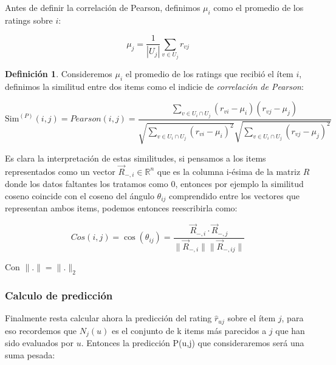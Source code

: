 \documentclass[hidelinks,12pt,a4paper]{book}
\providecommand{\norm}[1]{\lVert#1\rVert}
\theoremstyle{plain}
\theoremstyle{definition}
\newtheorem{definicion}[theorem]{Definición} %
\begin{document}
Antes de definir la correlación de Pearson, definimos $\mu_i$ como el promedio de los ratings sobre $i$:

\begin{equation}
\mu_j =\frac{1}{|U_j|} \sum_{v \in U_j} r_{vj}
\end{equation}

\begin{definicion}
Consideremos $\mu_i$ el promedio de los ratings que recibió el ítem $i$, definimos la similitud entre dos items como el indicie de \textit{correlación de Pearson}:

\begin{equation}
\text{Sim}^{(P)}(i,j) = Pearson(i,j) = \frac{ \sum_{v \in {U_i\cap U_j}} (r_{vi}-\mu_i)(r_{vj}-\mu_j) }{{\sqrt{\sum_{v \in {U_i\cap U_j}} (r_{vi}-\mu_i)^2}}{\sqrt{\sum_{v \in {U_i\cap U_j}}(r_{vj}-\mu_j)^2}}}
\end{equation}
\end{definicion}

Es clara la interpretación de estas similitudes, si pensamos a los items representados como un vector $\vec{R}_{-,i} \in \mathbb{R}^n$ que es la columna i-ésima de la matriz $R$ donde los datos faltantes los tratamos como 0, entonces por ejemplo la similitud coseno coincide con el coseno del ángulo $\theta_{ij}$ comprendido entre los vectores que representan ambos items, podemos entonces reescribirla como:

\begin{equation}
Cos(i,j) = \cos (\theta_{ij}) =\frac{\vec{R}_{-,i} \cdot \vec{R}_{-,j}}{\norm{\vec{R}_{-,i}} \norm{\vec{R}_{-,ij}}}
\end{equation}

Con $\norm{.} = \norm{.}_2$

\subsubsection{Calculo de predicción}
Finalmente resta calcular ahora la predicción del rating $\hat{r}_{uj}$ sobre el ítem $j$, para eso recordemos que $N_j(u)$ es el conjunto de k items más parecidos a $j$ que han sido evaluados por $u$. Entonces la predicción P(u,j) que consideraremos será una suma pesada:
\end{document}
